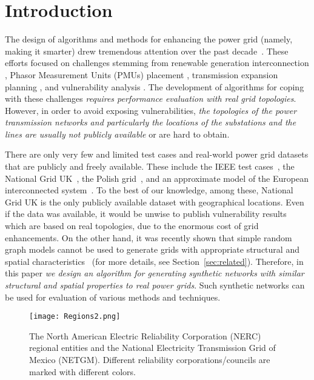 \documentclass[10pt,journal]{IEEEtran}
\begin{document}
\IEEEpeerreviewmaketitle



\section{Introduction}\label{sec:introduction}
The design of algorithms and methods for enhancing the power grid (namely, making it smarter) drew tremendous attention over the past decade~\cite{amin2008electric,fang2012smart}. These efforts focused on challenges stemming from renewable generation interconnection \cite{bienstock2014chance}, Phasor Measurement Units (PMUs) placement \cite{SYZ2015,zhao2012pmu}, transmission expansion planning \cite{latorre2003classification}, and vulnerability analysis \cite{Soltan2014Cascade,SmartGridComm11rep,asztalos2014cascading,chertkov2011predicting}.
The development of algorithms for coping with these challenges \emph{requires performance evaluation with real grid topologies}. However, in order to avoid exposing vulnerabilities, \emph{the topologies of the power transmission networks and particularly the locations of the substations and the lines are usually not publicly available} or are hard to obtain.





There are only very few and limited test cases and real-world power grid datasets that are publicly and freely available. These include the IEEE test cases~\cite{IEEEtestcase}, the National Grid UK~\cite{NGUK}, the Polish grid~\cite{Polishgrid}, and an approximate model of the European interconnected system~\cite{zhou2005approximate}. To the best of our knowledge, among these, National Grid UK is the only publicly available dataset with geographical locations.
Even if the data was available, it  would be unwise to publish vulnerability results which are based on real topologies, due to the enormous cost of grid enhancements. On the other hand, it was recently shown that simple random graph models cannot be used to generate grids with appropriate structural and spatial characteristics~\cite{cotilla2012comparing} (for more details, see Section~\ref{sec:related}).
Therefore, in this paper \emph{we design an algorithm for generating synthetic networks with similar structural and spatial properties to real power grids}. Such synthetic networks can be used for evaluation of various methods and techniques.

\begin{figure}[t]
\centering
\vspace*{-0.2cm}
\texttt{[image: Regions2.png]}
\vspace*{-0.2cm}
\caption{The North American Electric Reliability Corporation (NERC) regional entities and the National Electricity Transmission Grid of Mexico (NETGM). Different reliability corporations/councils are marked with different colors.}
\label{fig:NERC}
\vspace*{0.2cm}
\end{figure}
\end{document}
